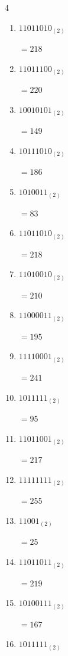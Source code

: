 \begin{multicols}{4}
\begin{enumerate}
        $=162$

\columnbreak %

  \item $11011010_{(2)}$

        $=218$

  \item $11011100_{(2)}$

        $=220$

  \item $10010101_{(2)}$

        $=149$

  \item $10111010_{(2)}$

        $=186$

  \item $1010011_{(2)}$

        $=83$

  \item $11011010_{(2)}$

        $=218$

  \item $11010010_{(2)}$

        $=210$

  \item $11000011_{(2)}$

        $=195$

  \item $11110001_{(2)}$

        $=241$

  \item $1011111_{(2)}$

        $=95$

  \item $11011001_{(2)}$

        $=217$

  \item $11111111_{(2)}$

        $=255$

  \item $11001_{(2)}$

        $=25$

  \item $11011011_{(2)}$

        $=219$

  \item $10100111_{(2)}$

        $=167$

\columnbreak %

  \item $1011111_{(2)}$


\end{enumerate}
\end{multicols}
